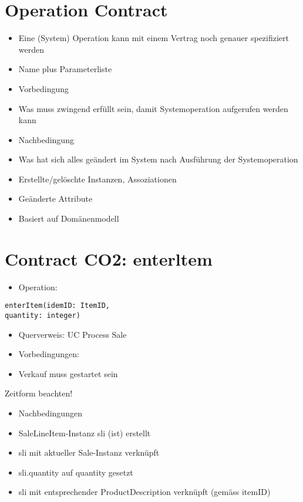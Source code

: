 \documentclass[10pt]{article}
\begin{document}
\section*{Operation Contract}
\begin{itemize}
  \item Eine (System) Operation kann mit einem Vertrag noch genauer spezifiziert werden
  \item Name plus Parameterliste
  \item Vorbedingung
  \item Was muss zwingend erfüllt sein, damit Systemoperation aufgerufen werden kann
  \item Nachbedingung
  \item Was hat sich alles geändert im System nach Ausführung der Systemoperation
  \item Erstellte/gelöschte Instanzen, Assoziationen
  \item Geänderte Attribute
  \item Basiert auf Domänenmodell
\end{itemize}

\section*{Contract CO2: enterltem}
\begin{itemize}
  \item Operation:
\end{itemize}

\begin{verbatim}
enterItem(idemID: ItemID,
quantity: integer)
\end{verbatim}

\begin{itemize}
  \item Querverweis: UC Process Sale
  \item Vorbedingungen:
  \item Verkauf muss gestartet sein
\end{itemize}

Zeitform beachten!

\begin{itemize}
  \item Nachbedingungen
  \item SaleLineItem-Instanz sli (ist) erstellt
  \item sli mit aktueller Sale-Instanz verknüpft
  \item sli.quantity auf quantity gesetzt
  \item sli mit entsprechender ProductDescription verknüpft (gemäss itemID)
\end{itemize}
\end{document}

